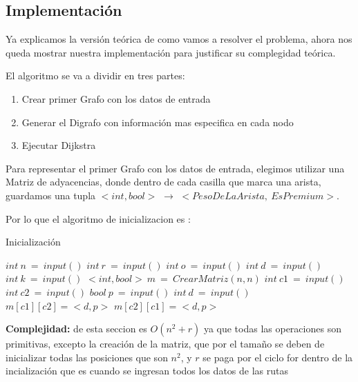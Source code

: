 \documentclass{article}
\begin{document}
\subsection{Implementación}
\par{Ya explicamos la versión teórica de como vamos a resolver el problema, ahora nos queda mostrar nuestra implementación  para justificar su complegidad teórica.}
\par{El algoritmo se va a dividir en tres partes:}
\begin{enumerate}
\item Crear primer Grafo con los datos de entrada
\item Generar el Digrafo con información mas especifica en cada nodo
\item Ejecutar Dijkstra
\end{enumerate}
\medskip
\medskip
\par{Para representar el primer Grafo con los datos de entrada, elegimos utilizar una Matriz de adyacencias, donde dentro de cada casilla que marca una arista, guardamos una tupla $<int, bool>$ $\rightarrow$ $<PesoDeLaArista,\ EsPremium>$.}
\medskip
\par{Por lo que el algoritmo de inicializacion es :}
\medskip

\newpage
\begin{algorithm}[h!]
  \caption{Inicialización}
  \begin{algorithmic}
 	\State $int\ n\ = \ input()$   
	\State $int\ r\ = \ input()$		
   	\State $int\ o\ = \ input()$		
  	\State $int\ d\ = \ input()$		
   	\State $int\ k\ = \ input()$		
   	\State $<int,bool>\ m \ = \ CrearMatriz(n,n)$ 
   	\For{$i \ \in\ [0..r)$}  
   		\State $int\ c1\ = \ input()$   
		\State $int\ c2\ = \ input()$   
		\State $bool\ p\ = \ input()$   
		\State $int\ d\ = \ input()$   
		\medskip
		\State $m[c1][c2]= <d,p>$		
		\State $m[c2][c1]= <d,p>$   		\\ 
		\medskip
   	\EndFor
   
  \end{algorithmic}
  \medskip
  \medskip 
  \par{\textbf{Complejidad:} de esta seccion es $O(n^2 + r)$ ya que todas las operaciones son primitivas, excepto la creación de la matriz, que por el tamaño se deben de inicializar todas las posiciones que son $n^2$, y $r$ se paga por el ciclo for dentro de la incialización que es cuando se ingresan todos los datos de las rutas}
\end{algorithm}
\medskip
\end{document}
